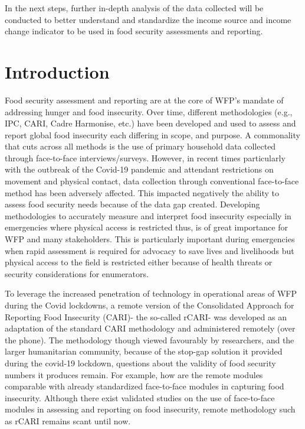 \documentclass[11pt,harvard]{article}
\begin{document}
In the next steps, further in-depth analysis of the data collected will be conducted to better understand and standardize the income source and income change indicator to be used in food security assessments and reporting.


\pagebreak
	
	\section{Introduction}

Food security assessment and reporting are at the core of WFP’s mandate of addressing hunger and food insecurity. Over time, different methodologies (e.g., IPC, CARI, Cadre Harmonise, etc.) have been developed and used to assess and report global food insecurity each differing in scope, and purpose. A commonality that cuts across all methods is the use of primary household data collected through face-to-face interviews/surveys. However, in recent times particularly with the outbreak of the Covid-19 pandemic and attendant restrictions on movement and physical contact, data collection through conventional face-to-face method has been adversely affected. This impacted negatively the ability to assess food security needs because of the data gap created. Developing methodologies to accurately measure and interpret food insecurity especially in emergencies where physical access is restricted thus, is of great importance for WFP and many stakeholders. This is particularly important during emergencies when rapid assessment is required for advocacy to save lives and livelihoods but physical access to the field is restricted either because of health threats or security considerations for enumerators. 

To leverage the increased penetration of technology in operational areas of WFP during the Covid lockdowns, a remote version of the Consolidated Approach for Reporting Food Insecurity (CARI)- the so-called rCARI- was developed as an adaptation of the standard CARI methodology and administered remotely (over the phone). The methodology though viewed favourably by researchers, and the larger humanitarian community, because of the stop-gap solution it provided during the covid-19 lockdown, questions about the validity of food security numbers it produces remain. For example, how are the remote modules comparable with already standardized face-to-face modules in capturing food insecurity. Although there exist validated studies on the use of face-to-face modules in assessing and reporting on food insecurity, remote methodology such as rCARI remains scant until now. 
\end{document}
